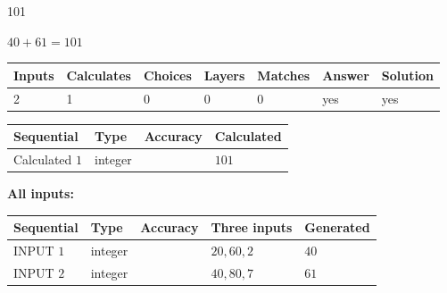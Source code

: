 \documentclass[12pt]{article}
\begin{document}
 
 
\noindent{}
 
 

101
 
 
\noindent{}
 
 

 
 
 
\noindent{}
 
 

$ %
40 +  %
61=   %
101$
 
 
\noindent{}
 
 

 
   
   
   
   
\noindent\begin{tabular}{|l|l|l|l|l|l|l|}
 \hline
Inputs & Calculates & Choices & Layers & Matches & Answer & Solution \\ \hline
 2  & 
 1  & 
 0
  & 
 0  & 
 0  & 
  yes & 
  yes 
  \\ \hline
 \end{tabular}
   
   
   
   
\noindent{}
   
   
  
  
\noindent\begin{tabular}{|l|l|l|l|}
\hline
 Sequential & Type & Accuracy & Calculated \\ 
\hline
 
 
  Calculated $  1 $ & integer &  & 
  $ 101 $ 
 \\  \hline  
 \end{tabular}
   
   
   
   
\noindent\vspace{0.1in}\hspace{-0.08in} {\textbf{\Large{All inputs: }}}
   
   
  
  
\noindent\begin{tabular}{|l|l|l|l|l|}
\hline
 Sequential & Type & Accuracy & Three inputs & Generated \\ 
\hline
 
 
  INPUT $  1 $ & integer &  & $
 20
 , 
 60
 , 
 2
 $ & $ 40 $ 
 \\  \hline  
 
 
  INPUT $  2 $ & integer &  & $
 40
 , 
 80
 , 
 7
 $ & $ 61 $ 
 \\  \hline  
 \end{tabular}
   
\end{document}
